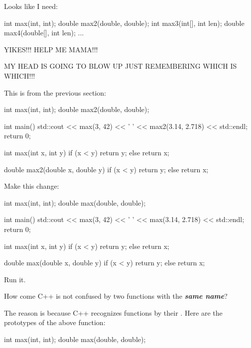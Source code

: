 Looks like I need:

\begin{consolethree}[escapeinside=||]
int max(int, int);
double max2(double, double);
int max3(int[], int len);
double max4(double[], int len);
...
\end{consolethree}

YIKES!!! HELP ME MAMA!!!

MY HEAD IS GOING TO BLOW UP JUST REMEMBERING WHICH IS WHICH!!!


\newpage{}

This is from the previous section:

\begin{consolethree}[escapeinside=||]
int max(int, int);
double max2(double, double);

int main()
{
    std::cout << max(3, 42) << ' '
              << max2(3.14, 2.718) << std::endl;
    return 0;
}

int max(int x, int y)
{
    if (x < y) return y;
    else return x;
}

double max2(double x, double y)
{
    if (x < y) return y;
    else return x;
}
\end{consolethree}

Make this change:

\begin{consolethree}[escapeinside=||]
int max(int, int);
double max(double, double);

int main()
{
    std::cout << max(3, 42) << ' '
              << max(3.14, 2.718) << std::endl;
    return 0;
}

int max(int x, int y)
{
    if (x < y) return y;
    else return x;
}

double max(double x, double y)
{
    if (x < y) return y;
    else return x;
}
\end{consolethree}

Run it.


How come C++ is not confused by two functions with the \textbf{\textit{same name}}?

The reason is because C++ recognizes functions by their . Here are the prototypes of the above function:

\begin{consolethree}[escapeinside=||]
int max(int, int);
double max(double, double);
\end{consolethree}

